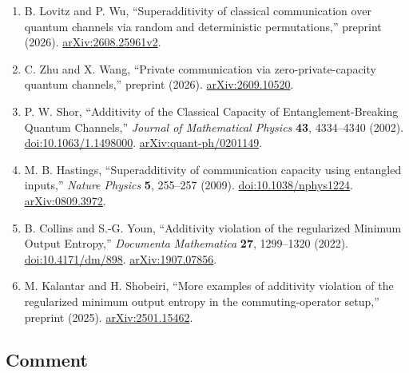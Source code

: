 \begin{enumerate}[label={},leftmargin=4.8em,labelsep=0.5em]
  \footnotesize
  \item[\textup{[LW26]}]\label{ref:rca-lovitz-wu}
  B. Lovitz and P. Wu, ``Superadditivity of classical communication over quantum channels via random and deterministic permutations,'' preprint (2026). \href{https://arxiv.org/abs/2608.25961v2}{arXiv:2608.25961v2}.

  \item[\textup{[ZW26]}]\label{ref:rca-zhu-wang}
  C. Zhu and X. Wang, ``Private communication via zero-private-capacity quantum channels,'' preprint (2026). \href{https://arxiv.org/abs/2609.10520}{arXiv:2609.10520}.

  \item[\textup{[Sho02]}]\label{ref:rca-shor}
  P. W. Shor, ``Additivity of the Classical Capacity of Entanglement-Breaking Quantum Channels,'' \emph{Journal of Mathematical Physics} \textbf{43}, 4334--4340 (2002). \href{https://doi.org/10.1063/1.1498000}{doi:10.1063/1.1498000}. \href{https://arxiv.org/abs/quant-ph/0201149}{arXiv:quant-ph/0201149}.

  \item[\textup{[Has09]}]\label{ref:rca-hastings}
  M. B. Hastings, ``Superadditivity of communication capacity using entangled inputs,'' \emph{Nature Physics} \textbf{5}, 255--257 (2009). \href{https://doi.org/10.1038/nphys1224}{doi:10.1038/nphys1224}. \href{https://arxiv.org/abs/0809.3972}{arXiv:0809.3972}.

  \item[\textup{[CY22]}]\label{ref:rca-collins-youn}
  B. Collins and S.-G. Youn, ``Additivity violation of the regularized Minimum Output Entropy,'' \emph{Documenta Mathematica} \textbf{27}, 1299--1320 (2022). \href{https://doi.org/10.4171/dm/898}{doi:10.4171/dm/898}. \href{https://arxiv.org/abs/1907.07856}{arXiv:1907.07856}.

  \item[\textup{[KS25]}]\label{ref:rca-kalantar-shobeiri}
  M. Kalantar and H. Shobeiri, ``More examples of additivity violation of the regularized minimum output entropy in the commuting-operator setup,'' preprint (2025). \href{https://arxiv.org/abs/2501.15462}{arXiv:2501.15462}.
\end{enumerate}

\subsection*{Comment}

